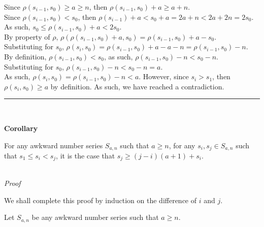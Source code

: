 \documentclass[a4paper,12pt]{article}
\begin{document}
\noindent Since $\rho(s_{i - 1}, s_0) \geq a \geq n$, then $\rho(s_{i - 1}, s_0) + a \geq a + n$.\\

\noindent Since $\rho(s_{i - 1}, s_0) < s_0$, then $\rho(s_{i - 1}) + a < s_0 + a = 2a + n < 2a + 2n = 2s_0$.\\

\noindent As such, $s_0 \leq \rho(s_{i - 1}, s_0) + a < 2s_0$.\\

\noindent By property of $\rho$, $\rho(\rho(s_{i - 1}, s_0) + a, s_0) = \rho(s_{i - 1}, s_0) + a - s_0$.\\

\noindent Substituting for $s_0$, $\rho(s_i, s_0) = \rho(s_{i - 1}, s_0) + a - a - n = \rho(s_{i - 1}, s_0) - n$.\\

\noindent By definition, $\rho(s_{i - 1}, s_0) < s_0$, as such, $\rho(s_{i - 1}, s_0) - n < s_0 - n$.\\

\noindent Substituting for $s_0$, $\rho(s_{i - 1}, s_0) - n < s_0 - n = a$.\\

\noindent As such, $\rho(s_i, s_0) = \rho(s_{i - 1}, s_0) - n < a$. However, since $s_i > s_1$, then $\rho(s_i, s_0) \geq a$ by definition. As such, we have reached a contradiction.


\begin{center}
\noindent\rule{8cm}{0.4pt}
\end{center}
\noindent \\







\label{lemma:min_length_one_staple}
\hypertarget{lemma:min_length_one_staple}{}
\begin{tcolorbox}
\textbf{Corollary}

\noindent For any awkward number series $S_{a,n}$ such that $a \geq n$, for any $s_i, s_j \in S_{a, n}$ such that $s_1 \leq s_i < s_j$, it is the case that $s_j \geq (j - i)(a + 1) + s_i$.

\end{tcolorbox}

\noindent \\
\textit{Proof}

\noindent We shall complete this proof by induction on the difference of $i$ and $j$.

\noindent Let $S_{a, n}$ be any awkward number series such that $a \geq n$.
\end{document}
